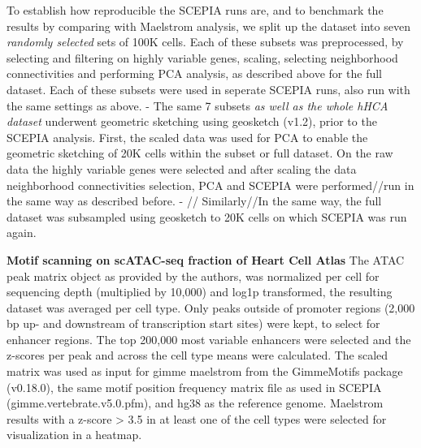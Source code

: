 To establish how reproducible the SCEPIA runs are, and to benchmark the results by comparing with Maelstrom analysis, we split up the dataset into seven \textit{randomly selected} sets of 100K cells. Each of these subsets was preprocessed, by selecting and filtering on highly variable genes, scaling, selecting neighborhood connectivities and performing PCA analysis, as described above for the full dataset. Each of these subsets were used in seperate SCEPIA runs, also run with the same settings as above. 
- The same 7 subsets\textit{ as well as the whole hHCA dataset} underwent geometric sketching using geosketch (v1.2), prior to the SCEPIA analysis. First, the scaled data was used for PCA to enable the geometric sketching of 20K cells within the subset or full dataset. On the raw data the highly variable genes were selected and after scaling the data neighborhood connectivities selection, PCA and SCEPIA were performed//run in the same way as described before.
- // Similarly//In the same way, the full dataset was subsampled using geosketch to 20K cells on which SCEPIA was run again.

\textbf{Motif scanning on scATAC-seq fraction of Heart Cell Atlas}
The ATAC peak matrix object as provided by the authors, was normalized per cell for sequencing depth (multiplied by 10,000) and log1p transformed, the resulting dataset was averaged per cell type. Only peaks outside of promoter regions (2,000 bp up- and downstream of transcription start sites) were kept, to select for enhancer regions. The top 200,000 most variable enhancers were selected and the z-scores per peak and across the cell type means were calculated. The scaled matrix was used as input for gimme maelstrom from the GimmeMotifs package (v0.18.0), the same motif position frequency matrix file as used in SCEPIA (gimme.vertebrate.v5.0.pfm), and hg38 as the reference genome. Maelstrom results with a z-score > 3.5 in at least one of the cell types were selected for visualization in a heatmap. 

